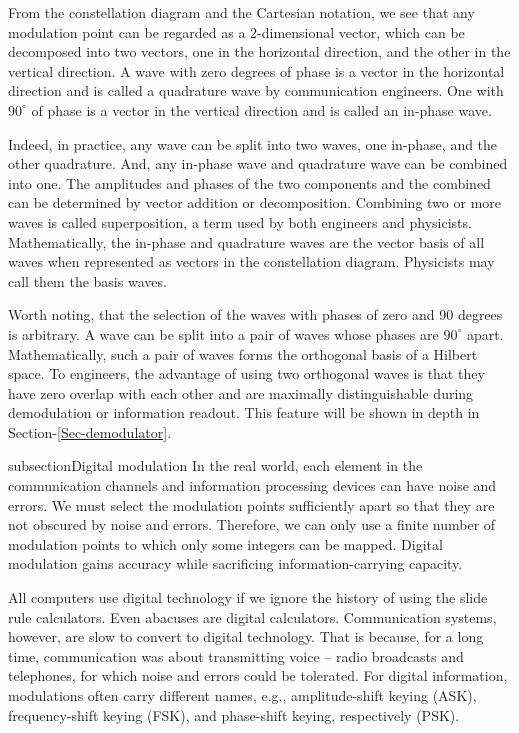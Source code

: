 \documentclass[oneside, letter, 12pt]{book}
\begin{document}
From the constellation diagram and the Cartesian notation, we see that any modulation point can be regarded as a 2-dimensional vector, which can be decomposed into two vectors, one in the horizontal direction, and the other in the vertical direction. A wave with zero degrees of phase is a vector in the horizontal direction and is called a quadrature wave by communication engineers. One with $90^\circ$ of phase is a vector in the vertical direction and is called an in-phase wave.

Indeed, in practice, any wave can be split into two waves, one in-phase, and the other quadrature. And, any in-phase wave and quadrature wave can be combined into one. The amplitudes and phases of the two components and the combined can be determined by vector addition or decomposition. Combining two or more waves is called superposition, a term used by both engineers and physicists. Mathematically, the in-phase and quadrature waves are the vector basis of all waves when represented as vectors in the constellation diagram. Physicists may call them the basis waves.

Worth noting, that the selection of the waves with phases of zero and 90 degrees is arbitrary. A wave can be split into a pair of waves whose phases are $90^\circ$ apart. Mathematically, such a pair of waves forms the orthogonal basis of a Hilbert space. To engineers, the advantage of using two orthogonal waves is that they have zero overlap with each other and are maximally distinguishable during demodulation or information readout. This feature will be shown in depth in Section-\ref{Sec-demodulator}.

subsection{Digital modulation}
In the real world, each element in the communication channels and information processing devices can have noise and errors. We must select the modulation points sufficiently apart so that they are not obscured by noise and errors. Therefore, we can only use a finite number of modulation points to which only some integers can be mapped. Digital modulation gains accuracy while sacrificing information-carrying capacity.

All computers use digital technology if we ignore the history of using the slide rule calculators. Even abacuses are digital calculators. Communication systems, however, are slow to convert to digital technology. That is because, for a long time, communication was about transmitting voice -- radio broadcasts and telephones, for which noise and errors could be tolerated. For digital information, modulations often carry different names, e.g., amplitude-shift keying (ASK), frequency-shift keying (FSK), and phase-shift keying, respectively (PSK).
\end{document}

